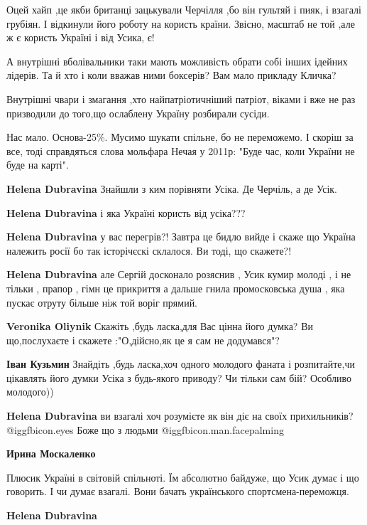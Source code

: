 \begin{itemize}
Оцей хайп ,це якби британці зацькували Черчілля ,бо він гультяй і пияк, і
взагалі грубіян. І відкинули його роботу на користь країни. Звісно, масштаб не
той ,але ж є користь Україні і від Усика, є!

А внутрішні вболівальники таки мають можливість обрати собі інших ідейних
лідерів. Та й хто і коли вважав ними боксерів? Вам мало прикладу Кличка?

Внутрішні чвари і змагання ,хто найпатріотичніший патріот, віками і вже не раз
призводили до того,що ослаблену Україну розбирали сусіди.

Нас мало. Основа-25\%. Мусимо шукати спільне, бо не переможемо. І скоріш за
все, тоді справдяться слова мольфара Нечая у 2011р: "Буде час, коли України не
буде на карті".

\begin{itemize} %
\textbf{Helena Dubravina} Знайшли з ким порівняти Усіка. Де Черчіль, а де Усік.

\textbf{Helena Dubravina} і яка Україні користь від усіка???

\textbf{Helena Dubravina} у вас перегрів?! Завтра це бидло вийде і скаже що Україна належить росії бо так історічєскі склалося. Ви тоді, що скажете?!

\textbf{Helena Dubravina} але Сергій досконало розяснив , Усик кумир молоді , і не тільки , прапор , гімн це прикриття а дальше гнила промосковська душа , яка пускає отруту більше ніж той воріг прямий.

\textbf{Veronika Oliynik} Скажіть ,будь ласка,для Вас цінна його думка? Ви що,послухаєте і скажете :"О,дійсно,як це я сам не додумався"?

\textbf{Іван Кузьмин} Знайдіть ,будь ласка,хоч одного молодого фаната і розпитайте,чи цікавлять його думки Усіка з будь-якого приводу? Чи тільки сам бій? Особливо молодого))

\textbf{Helena Dubravina} ви взагалі хоч розумієте як він діє на своїх прихильників? @igg{fbicon.eyes} 
Боже що з людьми @igg{fbicon.man.facepalming} 

\textbf{Ирина Москаленко} 

Плюсик Україні в світовій спільноті. Їм абсолютно байдуже, що Усик думає і що
говорить. І чи думає взагалі. Вони бачать українського спортсмена-переможця.


\textbf{Helena Dubravina} 


\end{itemize}
\end{itemize}
